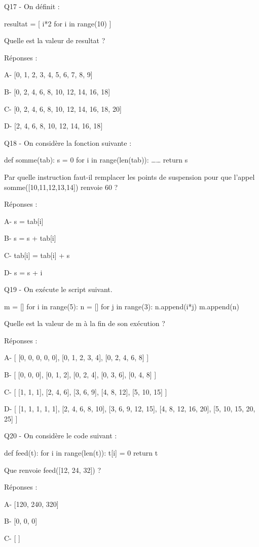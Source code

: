 \documentclass[
]{book}
\begin{document}
Q17 - On définit :

resultat = {[} i*2 for i in range(10) {]}

Quelle est la valeur de resultat ?

Réponses :

A- {[}0, 1, 2, 3, 4, 5, 6, 7, 8, 9{]}

B- {[}0, 2, 4, 6, 8, 10, 12, 14, 16, 18{]}

C- {[}0, 2, 4, 6, 8, 10, 12, 14, 16, 18, 20{]}

D- {[}2, 4, 6, 8, 10, 12, 14, 16, 18{]}

Q18 - On considère la fonction suivante :

def somme(tab):
s = 0
for i in range(len(tab)):
\ldots\ldots{}
return s

Par quelle instruction faut-il remplacer les points de suspension pour que l'appel somme({[}10,11,12,13,14{]}) renvoie 60 ?

Réponses :

A- s = tab{[}i{]}

B- s = s + tab{[}i{]}

C- tab{[}i{]} = tab{[}i{]} + s

D- s = s + i

Q19 - On exécute le script suivant.

m = {[}{]}
for i in range(5):
n = {[}{]}
for j in range(3):
n.append(i*j)
m.append(n)

Quelle est la valeur de m à la fin de son exécution ?

Réponses :

A- {[} {[}0, 0, 0, 0, 0{]}, {[}0, 1, 2, 3, 4{]}, {[}0, 2, 4, 6, 8{]} {]}

B- {[} {[}0, 0, 0{]}, {[}0, 1, 2{]}, {[}0, 2, 4{]}, {[}0, 3, 6{]}, {[}0, 4, 8{]} {]}

C- {[} {[}1, 1, 1{]}, {[}2, 4, 6{]}, {[}3, 6, 9{]}, {[}4, 8, 12{]}, {[}5, 10, 15{]} {]}

D- {[} {[}1, 1, 1, 1, 1{]}, {[}2, 4, 6, 8, 10{]}, {[}3, 6, 9, 12, 15{]}, {[}4, 8, 12, 16, 20{]}, {[}5, 10, 15, 20, 25{]} {]}

Q20 - On considère le code suivant :

def feed(t):
for i in range(len(t)):
t{[}i{]} = 0
return t

Que renvoie feed({[}12, 24, 32{]}) ?

Réponses :

A- {[}120, 240, 320{]}

B- {[}0, 0, 0{]}

C- {[} {]}
\end{document}
